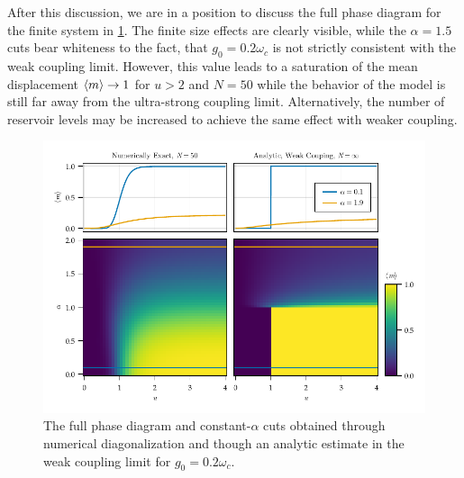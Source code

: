 \documentclass[fontsize=10pt,paper=b5,open=any,
twoside=no,toc=listof,toc=bibliography,headings=optiontohead,
captions=nooneline,captions=tableabove,english,DIV=15,numbers=noenddot,final,parskip=half-,
headinclude=true,footinclude=false,BCOR=0mm]{scrartcl}
\begin{document}
After this discussion, we are in a position to discuss the full phase
diagram for the finite system in
\cref{fig:example_finite_vs_continuum}. The finite size effects are
clearly visible, while the \(α=1.5\) cuts bear whiteness to the fact,
that \(g_{0}=0.2 ω_{c}\) is not strictly consistent with the weak
coupling limit. However, this value leads to a saturation of the mean
displacement \(\ev{m}\to 1\) for \(u>2\) and \(N=50\) while the
behavior of the model is still far away from the ultra-strong coupling
limit. Alternatively, the number of reservoir levels may be increased
to achieve the same effect with weaker coupling.
\begin{figure}[H]
  \centering
  \includegraphics{plots/example_finite_vs_continuum}
  \caption{\label{fig:example_finite_vs_continuum} The full phase
    diagram and constant-\(α\) cuts obtained through numerical
    diagonalization and though an analytic estimate in the weak
    coupling limit for \(g_{0}=0.2 ω_{c}\).}
\end{figure}


\printbibliography{}
\printacronyms{}
\end{document}
